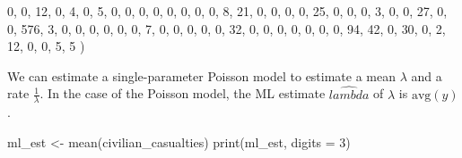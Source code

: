 \documentclass[
]{book}
\newenvironment{Shaded}{\begin{snugshade}}{\end{snugshade}}
\newcommand{\AttributeTok}[1]{\textcolor[rgb]{0.77,0.63,0.00}{#1}}
\newcommand{\DecValTok}[1]{\textcolor[rgb]{0.00,0.00,0.81}{#1}}
\newcommand{\FunctionTok}[1]{\textcolor[rgb]{0.00,0.00,0.00}{#1}}
\newcommand{\NormalTok}[1]{#1}
\newcommand{\OtherTok}[1]{\textcolor[rgb]{0.56,0.35,0.01}{#1}}
\begin{document}
\begin{Shaded}
\begin{Highlighting}[]
                          \DecValTok{0}\NormalTok{, }\DecValTok{0}\NormalTok{, }\DecValTok{12}\NormalTok{, }\DecValTok{0}\NormalTok{, }\DecValTok{4}\NormalTok{, }\DecValTok{0}\NormalTok{, }\DecValTok{5}\NormalTok{, }\DecValTok{0}\NormalTok{, }\DecValTok{0}\NormalTok{, }\DecValTok{0}\NormalTok{, }\DecValTok{0}\NormalTok{, }\DecValTok{0}\NormalTok{, }\DecValTok{0}\NormalTok{, }\DecValTok{0}\NormalTok{, }\DecValTok{0}\NormalTok{, }\DecValTok{8}\NormalTok{, }\DecValTok{21}\NormalTok{, }\DecValTok{0}\NormalTok{, }\DecValTok{0}\NormalTok{, }\DecValTok{0}\NormalTok{, }\DecValTok{0}\NormalTok{, }\DecValTok{25}\NormalTok{, }\DecValTok{0}\NormalTok{, }\DecValTok{0}\NormalTok{, }\DecValTok{0}\NormalTok{,}
                          \DecValTok{3}\NormalTok{, }\DecValTok{0}\NormalTok{, }\DecValTok{0}\NormalTok{, }\DecValTok{27}\NormalTok{, }\DecValTok{0}\NormalTok{, }\DecValTok{0}\NormalTok{, }\DecValTok{576}\NormalTok{, }\DecValTok{3}\NormalTok{, }\DecValTok{0}\NormalTok{, }\DecValTok{0}\NormalTok{, }\DecValTok{0}\NormalTok{, }\DecValTok{0}\NormalTok{, }\DecValTok{0}\NormalTok{, }\DecValTok{0}\NormalTok{, }\DecValTok{7}\NormalTok{, }\DecValTok{0}\NormalTok{, }\DecValTok{0}\NormalTok{, }\DecValTok{0}\NormalTok{, }\DecValTok{0}\NormalTok{, }\DecValTok{0}\NormalTok{, }\DecValTok{32}\NormalTok{, }\DecValTok{0}\NormalTok{, }\DecValTok{0}\NormalTok{, }\DecValTok{0}\NormalTok{, }\DecValTok{0}\NormalTok{,}
                          \DecValTok{0}\NormalTok{, }\DecValTok{0}\NormalTok{, }\DecValTok{0}\NormalTok{, }\DecValTok{94}\NormalTok{, }\DecValTok{42}\NormalTok{, }\DecValTok{0}\NormalTok{, }\DecValTok{30}\NormalTok{, }\DecValTok{0}\NormalTok{, }\DecValTok{2}\NormalTok{, }\DecValTok{12}\NormalTok{, }\DecValTok{0}\NormalTok{, }\DecValTok{0}\NormalTok{, }\DecValTok{5}\NormalTok{, }\DecValTok{5}\NormalTok{ ) }
\end{Highlighting}
\end{Shaded}

We can estimate a single-parameter Poisson model to estimate a mean
\(\lambda\) and a rate \(\frac{1}{\lambda}\). In the case of the Poisson
model, the ML estimate \(\hat{lambda}\) of \(\lambda\) is
\(\text{avg}(y)\).

\begin{Shaded}
\begin{Highlighting}[]
\NormalTok{ml\_est }\OtherTok{\textless{}{-}} \FunctionTok{mean}\NormalTok{(civilian\_casualties)}
\FunctionTok{print}\NormalTok{(ml\_est, }\AttributeTok{digits =} \DecValTok{3}\NormalTok{)}
\end{Highlighting}
\end{Shaded}
\end{document}
